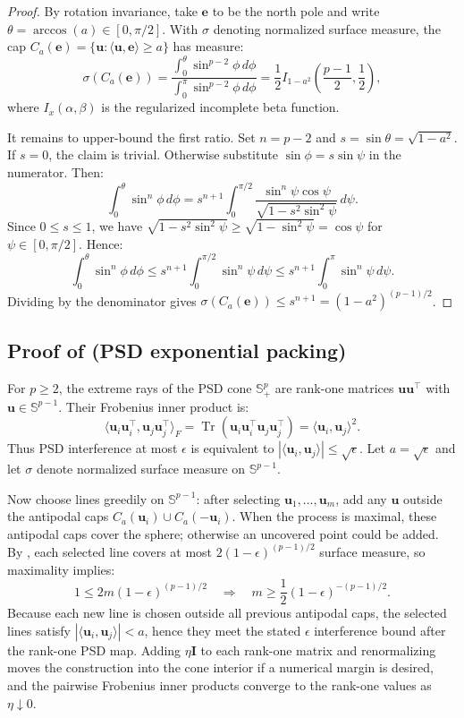 \documentclass{article}
\newcommand{\1}{\bm{1}}
\newcommand{\lrangle}[1]{\langle#1\rangle}
\def\eps{{\epsilon}}
\def\ve{{\bm{e}}}
\def\vu{{\bm{u}}}
\def\mI{{\bm{I}}}
\def\sS{{\mathbb{S}}}
\DeclareMathOperator{\Tr}{Tr}
\theoremstyle{definition}
\begin{document}
\begin{proof}
  By rotation invariance, take $\ve$ to be the north pole and write
  $\theta=\arccos(a)\in[0,\pi/2]$. With $\sigma$ denoting normalized surface measure, the cap
  $C_a(\ve)=\{\vu:\lrangle{\vu,\ve}\ge a\}$ has measure:
  \[
    \sigma(C_a(\ve))
    = \frac{\int_0^\theta \sin^{p-2}\phi\,d\phi}
    {\int_0^\pi \sin^{p-2}\phi\,d\phi}
    = \frac12 I_{1-a^2}\!\left(\frac{p-1}{2},\frac12\right),
  \]
  where $I_x(\alpha,\beta)$ is the regularized incomplete beta function.

  It remains to upper-bound the first ratio. Set $n=p-2$ and $s=\sin\theta=\sqrt{1-a^2}$. If $s=0$,
  the claim is trivial. Otherwise substitute $\sin\phi=s\sin\psi$ in the numerator. Then:
  \[
    \int_0^\theta \sin^n\phi\,d\phi
    = s^{n+1}\int_0^{\pi/2}
    \frac{\sin^n\psi\cos\psi}
    {\sqrt{1-s^2\sin^2\psi}}\,d\psi .
  \]
  Since $0\le s\le1$, we have $\sqrt{1-s^2\sin^2\psi}\ge\sqrt{1-\sin^2\psi}=\cos\psi$ for
  $\psi\in[0,\pi/2]$. Hence:
  \[
    \int_0^\theta \sin^n\phi\,d\phi
    \le s^{n+1}\int_0^{\pi/2}\sin^n\psi\,d\psi
    \le s^{n+1}\int_0^\pi\sin^n\psi\,d\psi .
  \]
  Dividing by the denominator gives $\sigma(C_a(\ve))\le s^{n+1}=(1-a^2)^{(p-1)/2}$.
\end{proof}

\subsection{\texorpdfstring{Proof of  (PSD exponential packing)}{Proof of PSD exponential packing}}

For $p\ge2$, the extreme rays of the PSD cone $\sS^p_{+}$ are rank-one matrices $\vu\vu^\top$ with
$\vu\in\mathbb{S}^{p-1}$. Their Frobenius inner product is:
\[
  \lrangle{\vu_i\vu_i^\top,\vu_j\vu_j^\top}_F
  = \Tr(\vu_i\vu_i^\top\vu_j\vu_j^\top)
  = \lrangle{\vu_i,\vu_j}^2 .
\]
Thus PSD interference at most $\eps$ is equivalent to $|\lrangle{\vu_i,\vu_j}|\le\sqrt{\eps}$. Let
$a=\sqrt{\eps}$ and let $\sigma$ denote normalized surface measure on $\mathbb{S}^{p-1}$.

Now choose lines greedily on $\mathbb{S}^{p-1}$: after selecting $\vu_1,\dots,\vu_m$, add any $\vu$
outside the antipodal caps $C_a(\vu_i)\cup C_a(-\vu_i)$. When the process is maximal, these
antipodal caps cover the sphere; otherwise an uncovered point could be added. By
, each selected line covers at most $2(1-\eps)^{(p-1)/2}$ surface
measure, so maximality implies:
\[
  1 \le 2m(1-\eps)^{(p-1)/2}
  \quad\Rightarrow\quad
  m \ge \frac12(1-\eps)^{-(p-1)/2}.
\]
Because each new line is chosen outside all previous antipodal caps, the selected lines satisfy
$|\lrangle{\vu_i,\vu_j}|<a$, hence they meet the stated $\eps$ interference bound after the
rank-one PSD map. Adding $\eta\mI$ to each rank-one matrix and renormalizing moves the construction
into the cone interior if a numerical margin is desired, and the pairwise Frobenius inner products
converge to the rank-one values as $\eta\downarrow0$.
\end{document}
